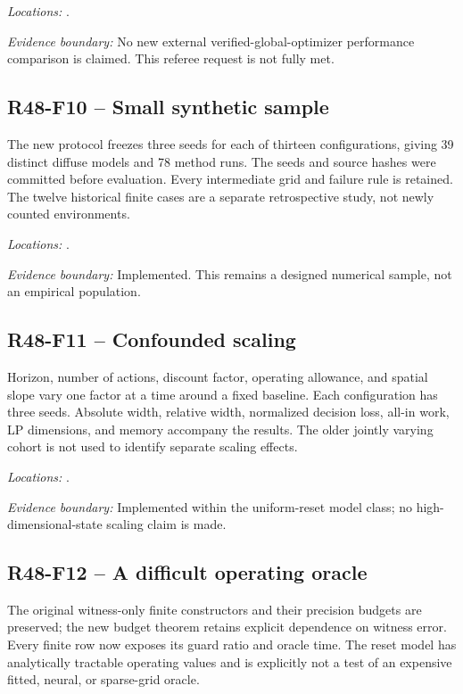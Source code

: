 \noindent\emph{Locations:} .

\noindent\emph{Evidence boundary:} No new external verified-global-optimizer performance comparison is claimed. This referee request is not fully met.

\subsection{R48-F10 -- Small synthetic sample}
The new protocol freezes three seeds for each of thirteen configurations, giving 39 distinct diffuse models and 78 method runs. The seeds and source hashes were committed before evaluation. Every intermediate grid and failure rule is retained. The twelve historical finite cases are a separate retrospective study, not newly counted environments.

\noindent\emph{Locations:} .

\noindent\emph{Evidence boundary:} Implemented. This remains a designed numerical sample, not an empirical population.

\subsection{R48-F11 -- Confounded scaling}
Horizon, number of actions, discount factor, operating allowance, and spatial slope vary one factor at a time around a fixed baseline. Each configuration has three seeds. Absolute width, relative width, normalized decision loss, all-in work, LP dimensions, and memory accompany the results. The older jointly varying cohort is not used to identify separate scaling effects.

\noindent\emph{Locations:} .

\noindent\emph{Evidence boundary:} Implemented within the uniform-reset model class; no high-dimensional-state scaling claim is made.

\subsection{R48-F12 -- A difficult operating oracle}
The original witness-only finite constructors and their precision budgets are preserved; the new budget theorem retains explicit dependence on witness error. Every finite row now exposes its guard ratio and oracle time. The reset model has analytically tractable operating values and is explicitly not a test of an expensive fitted, neural, or sparse-grid oracle.

